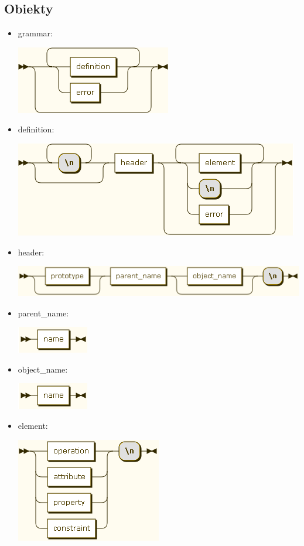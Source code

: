 \documentclass[a4paper,11pt,notitlepage]{article}
\begin{document}
\subsection{Obiekty}
\begin{itemize}
\item grammar:

\includegraphics[scale=0.66]{images/grammar/grammar.png}

\item definition:

\includegraphics[scale=0.66]{images/grammar/definition.png}

\item header:

\includegraphics[scale=0.66]{images/grammar/header.png}

\item parent\_name:

\includegraphics[scale=0.66]{images/grammar/name_xx.png}

\item object\_name:

\includegraphics[scale=0.66]{images/grammar/name_xx.png}

\item element:

\includegraphics[scale=0.66]{images/grammar/element.png}
\end{itemize}
\end{document}
